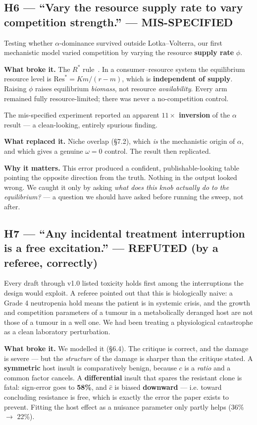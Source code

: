 \documentclass[11pt,a4paper]{article}
\newcommand{\chat}{\hat{c}}
\begin{document}
\subsection*{H6 --- ``Vary the resource supply rate to vary competition strength.'' --- \textcolor{orange!70!black}{MIS-SPECIFIED}}

Testing whether $\alpha$-dominance survived outside Lotka--Volterra, our first
mechanistic model varied competition by varying the resource \textbf{supply rate} $\phi$.

\textbf{What broke it.} The $R^*$ rule~\citep{tilman1982resource}. In a
consumer--resource system the equilibrium resource level is
$\mathrm{Res}^* = K m/(r - m)$, which is \textbf{independent of supply}. Raising $\phi$ raises equilibrium \emph{biomass}, not resource
\emph{availability}. Every arm remained fully resource-limited; there was never a
no-competition control.

The mis-specified experiment reported an apparent \textbf{$11\times$ inversion} of the
$\alpha$ result --- a clean-looking, entirely spurious finding.

\textbf{What replaced it.} Niche overlap (\S7.2), which \emph{is} the mechanistic origin
of $\alpha$, and which gives a genuine $\omega = 0$ control. The result then replicated.

\textbf{Why it matters.} This error produced a confident, publishable-looking table
pointing the opposite direction from the truth. Nothing in the output looked wrong. We
caught it only by asking \emph{what does this knob actually do to the equilibrium?} ---
a question we should have asked before running the sweep, not after.


\subsection*{H7 --- ``Any incidental treatment interruption is a free excitation.'' --- \textcolor{red!60!black}{REFUTED (by a referee, correctly)}}

Every draft through v1.0 listed toxicity holds first among the interruptions the design
would exploit. A referee pointed out that this is biologically naive: a Grade 4
neutropenia hold means the patient is in systemic crisis, and the growth and
competition parameters of a tumour in a metabolically deranged host are not those of a
tumour in a well one. We had been treating a physiological catastrophe as a clean
laboratory perturbation.

\textbf{What broke it.} We modelled it (\S6.4). The critique is correct, and the damage
is severe --- but the \emph{structure} of the damage is sharper than the critique
stated. A \textbf{symmetric} host insult is comparatively benign, because $c$ is a
\emph{ratio} and a common factor cancels. A \textbf{differential} insult that spares
the resistant clone is fatal: sign-error goes to \textbf{58\%}, and $\chat$ is biased
\textbf{downward} --- i.e. toward concluding resistance is free, which is exactly the
error the paper exists to prevent. Fitting the host effect as a nuisance parameter only
partly helps (36\% $\to$ 22\%).
\end{document}
